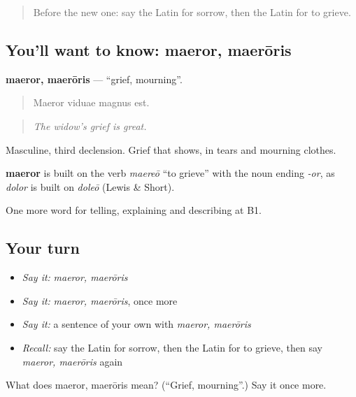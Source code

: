 \begin{quote}
Before the new one: say the Latin for sorrow, then the Latin for to grieve.
\end{quote}

\subsection*{You'll want to know: maeror, maerōris}
\textbf{maeror, maerōris} — \textquotedblleft{}grief, mourning\textquotedblright{}.

\begin{quote}
Maeror viduae magnus est.
\end{quote}

\begin{quote}
\emph{The widow's grief is great.}
\end{quote}

Masculine, third declension. Grief that shows, in tears and mourning clothes.

\begin{cousinweb}
\textbf{maeror} is built on the verb \emph{maereō} \textquotedblleft{}to grieve\textquotedblright{} with the noun ending \emph{-or}, as \emph{dolor} is built on \emph{doleō} (Lewis \& Short).
\end{cousinweb}

\begin{grammarlens}[title={What you've built}]
One more word for telling, explaining and describing at B1.
\end{grammarlens}

\subsection*{Your turn}
\begin{itemize}
\raggedright
  \item \emph{Say it:} \emph{maeror, maerōris}
  \item \emph{Say it:} \emph{maeror, maerōris}, once more
  \item \emph{Say it:} a sentence of your own with \emph{maeror, maerōris}
  \item \emph{Recall:} say the Latin for sorrow, then the Latin for to grieve, then say \emph{maeror, maerōris} again
\end{itemize}

\begin{tcolorbox}[breakable,colback=teal!4,colframe=teal!35!black,title={Before you move on}]
What does maeror, maerōris mean? (\textquotedblleft{}Grief, mourning\textquotedblright{}.) Say it once more.
\end{tcolorbox}
